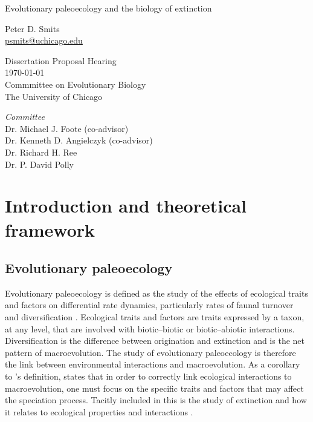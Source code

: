 \documentclass[12pt,letterpaper]{article}
\begin{document}
\setcounter{secnumdepth}{0}

\begin{titlepage}
  \begin{center}
    \huge{Evolutionary paleoecology and the biology of extinction}

    \vspace{1.5cm}

    \large{Peter D. Smits \\}
    \footnotesize{\href{mailto:psmits@uchicago.edu}{psmits@uchicago.edu}}

    \vspace{1.5cm}

    Dissertation Proposal Hearing \\
    \today \\
    Commmittee on Evolutionary Biology \\
    The University of Chicago

    \vspace{1.5cm}

    \textit{Committee} \\
    Dr. Michael J. Foote (co-advisor) \\
    Dr. Kenneth D. Angielczyk (co-advisor) \\
    Dr. Richard H. Ree \\
    Dr. P. David Polly
  \end{center}
\end{titlepage}

\linenumbers
\modulolinenumbers[2]


\section{Introduction and theoretical framework}

\subsection{Evolutionary paleoecology}
Evolutionary paleoecology is defined as the study of the effects of ecological traits and factors on differential rate dynamics, particularly rates of faunal turnover and diversification \citep{Kitchell1985a}. Ecological traits and factors are traits expressed by a taxon, at any level, that are involved with biotic--biotic or biotic--abiotic interactions. Diversification is the difference between origination and extinction and is the net pattern of macroevolution. The study of evolutionary paleoecology is therefore the link between environmental interactions and macroevolution. As a corollary to \citet{Kitchell1985a}'s definition, \citet{Allmon1994} states that in order to correctly link ecological interactions to macroevolution, one must focus on the specific traits and factors that may affect the speciation process. Tacitly included in this is the study of extinction and how it relates to ecological properties and interactions \citep{Kitchell1990}.
\end{document}

